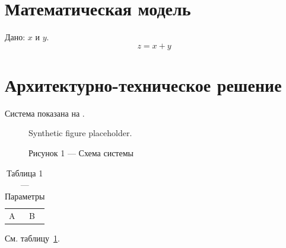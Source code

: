 \documentclass{gostcheck-vkr}
\begin{document}
\section{Математическая модель}
Дано: $x$ и $y$.
\[
z = x + y
\]
\section{Архитектурно-техническое решение}
Система показана на .
\begin{figure}
\centering
Synthetic figure placeholder.
\caption{Рисунок 1 — Схема системы}
\label{fig:demo}
\end{figure}
\begin{table}
\caption{Таблица 1 — Параметры}
\label{tab:demo}
\begin{tabular}{ll}
A & B \\
\end{tabular}
\end{table}
См. таблицу~\ref{tab:demo}.
\end{document}
